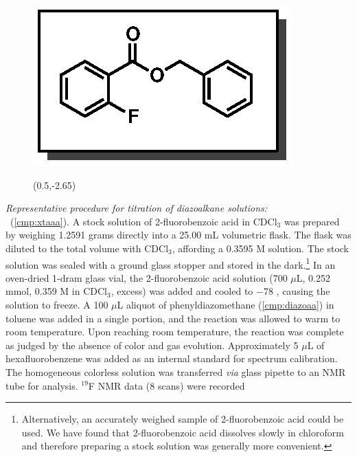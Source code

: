 \vspace{10pt}
\begin{figure}
  \vspace{-32pt}
  \begin{center}
    \includegraphics[scale=0.8]{chp_asymmetric/images/xtaaa}
    \begin{textblock}{1}(0.5,-2.65)  \end{textblock}
  \end{center}
  \vspace{-35pt}
\end{figure}\noindent \textit{Representative procedure for titration of
diazoalkane solutions:}\\ \textbf{\CMPxtaaa}\ (\ref{cmp:xtaaa}). A stock
solution of 2-fluorobenzoic acid in CDCl$_3$ was prepared by weighing 1.2591
grams directly into a 25.00 mL volumetric flask. The flask was diluted to the total
volume with CDCl$_3$, affording a 0.3595 M solution. The stock solution was
sealed with a ground glass stopper and stored in the
dark.\footnote{Alternatively, an accurately weighed sample of 2-fluorobenzoic
acid could be used. We have found that 2-fluorobenzoic acid dissolves slowly in
chloroform and therefore preparing a stock solution was generally more
convenient.} In an oven-dried 1-dram glass vial, the 2-fluorobenzoic acid
solution (700 $\mu$L, 0.252 mmol, 0.359 M in CDCl$_3$, excess) was added and
cooled to $-$78 \degc, causing the solution to freeze. A
100 $\mu$L aliquot of phenyldiazomethane (\ref{cmp:diazoaa}) in toluene was
added in a single portion, and the reaction was allowed to warm to room temperature. Upon reaching
room temperature, the reaction was complete as judged by the absence of color
and gas evolution. Approximately 5 $\mu$L of hexafluorobenzene was added as an
internal standard for spectrum calibration. The homogeneous colorless solution was transferred
\textit{via} glass pipette to an NMR tube for analysis. $^{19}$F NMR data (8 scans) were recorded
